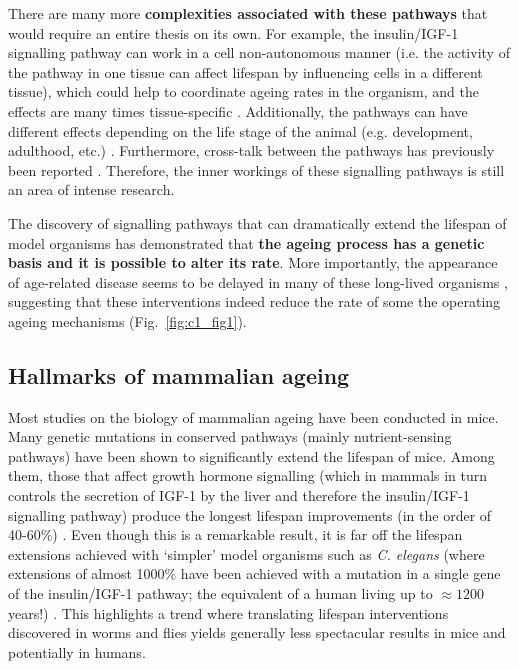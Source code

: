 \bigskip

There are many more \textbf{complexities associated with these pathways} that would require an entire thesis on its own. For example, the insulin/IGF-1 signalling pathway can work in a cell non-autonomous manner (i.e. the activity of the pathway in one tissue can affect lifespan by influencing cells in a different tissue), which could help to coordinate ageing rates in the organism, and the effects are many times tissue-specific \citep{Kenyon2005,Kenyon2010}. Additionally, the pathways can have different effects depending on the life stage of the animal (e.g. development, adulthood, etc.) \citep{Dillin2002}. Furthermore, cross-talk between the pathways has previously been reported \citep{Bonkowski2016, Greer2007}. Therefore, the inner workings of these signalling pathways is still an area of intense research.

\bigskip

The discovery of signalling pathways that can dramatically extend the lifespan of model organisms has demonstrated that \textbf{the ageing process has a genetic basis and it is possible to alter its rate}. More importantly, the appearance of age-related disease seems to be delayed in many of these long-lived organisms \citep{Kenyon2010,Arantes-Oliveira2003}, suggesting that these interventions indeed reduce the rate of some the operating ageing mechanisms (Fig.~\ref{fig:c1_fig1}). 

\smallskip

\subsection{Hallmarks of mammalian ageing} \label{s:1.1.3}

\smallskip

Most studies on the biology of mammalian ageing have been conducted in mice. Many genetic mutations in conserved pathways (mainly nutrient-sensing pathways) have been shown to significantly extend the lifespan of mice. Among them, those that affect growth hormone signalling (which in mammals in turn controls the secretion of IGF-1 by the liver and therefore the insulin/IGF-1 signalling pathway) produce the longest lifespan improvements (in the order of 40-60\%) \citep{Singh2019}. Even though this is a remarkable result, it is far off the lifespan extensions achieved with `simpler' model organisms such as \textit{C. elegans} (where extensions of almost 1000\% have been achieved with a mutation in a single gene of the insulin/IGF-1 pathway; the equivalent of a human living up to $\approx 1200$ years!) \citep{Ayyadevara2008}. This highlights a trend where translating lifespan interventions discovered in worms and flies yields generally less spectacular results in mice and potentially in humans.


